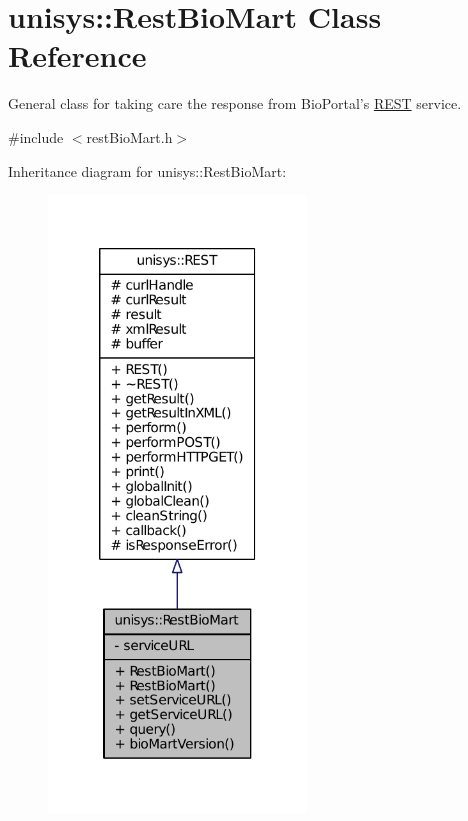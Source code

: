 \hypertarget{classunisys_1_1RestBioMart}{\section{unisys\-:\-:Rest\-Bio\-Mart Class Reference}
\label{classunisys_1_1RestBioMart}
}


General class for taking care the response from Bio\-Portal's \hyperlink{classunisys_1_1REST}{R\-E\-S\-T} service.  




{\ttfamily \#include $<$rest\-Bio\-Mart.\-h$>$}



Inheritance diagram for unisys\-:\-:Rest\-Bio\-Mart\-:
\nopagebreak
\begin{figure}[H]
\begin{center}
\leavevmode
\includegraphics[width=194pt]{classunisys_1_1RestBioMart__inherit__graph}
\end{center}
\end{figure}


